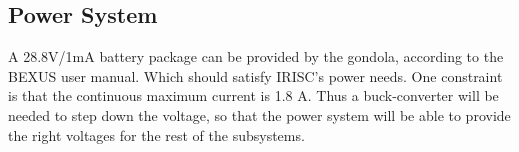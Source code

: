\pagebreak
\subsection{Power System}
\label{sec:4.7}
A 28.8V/1mA battery package can be provided by the gondola, according to the BEXUS user manual. Which should satisfy IRISC's power needs. One constraint is that the continuous maximum current is 1.8 A. Thus a buck-converter will be needed to step down the voltage, so that the power system will be able to provide the right voltages for the rest of the subsystems.  




\raggedbottom
